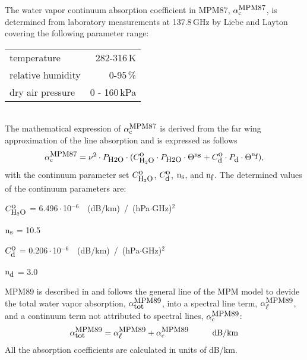 {
\label{levele:mpm87_h2ocont}
The water vapor continuum absorption coefficient in MPM87, $\alpha^{\mbox{\rm \small MPM87}}_{\rm c}$, 
is determined from laboratory measurements at 137.8\,GHz by Liebe 
and Layton covering the following parameter range:\\
\begin{tabular}{lr}
temperature          & 282-316\,K\\
relative humidity    & 0-95\,\%\\
dry air pressure     & 0 - 160\,kPa\\ 
\end{tabular}\\
The mathematical expression of $\alpha^{\mbox{\rm \small MPM87}}_{\rm c}$ is derived from the far wing 
approximation of the line absorption and is expressed as follows
\begin{equation} 
  \label{eq:mpm87:cont}
  \alpha^{\mbox{\rm \small MPM87}}_{\rm c} = \nu^2 \cdot P_{\mbox{\rm \small H2O}} \cdot 
                (C^{\mbox{\rm o}}_{\mbox{\rm \small H}_{2}\mbox{\rm \small O}} \cdot P_{\mbox{\rm \small H2O}} \cdot \Theta^{{\rm n}_{\mbox{\rm \small s}}} + 
                 C^{\mbox{\rm o}}_{\mbox{\rm \small d}} \cdot P_{\mbox{\rm \small d}}  \cdot \Theta^{{\rm n}_{\mbox{\rm \small f}}}),
\end{equation}
with the continuum parameter set $C^{\mbox{\rm o}}_{\mbox{\rm \small H}_{2}\mbox{\rm \small O}}$, $C^{\mbox{\rm o}}_{\mbox{\rm \small d}}$, ${\rm n}_{\mbox{\rm \small s}}$, and ${\rm n}_{\mbox{\rm \small f}}$. 
The determined values of the continuum parameters are:

\begin{description}
\item{$C^{\mbox{\rm o}}_{\mbox{\rm \small H}_{2}\mbox{\rm \small O}}$}   =  6.496\,$\cdot$\,10$^{-6}$~~(dB/km)~/~(hPa$\cdot$GHz)$^2$
\item{${\rm n}_{\mbox{\rm \small s}}$}    = 10.5
\item{$C^{\mbox{\rm o}}_{\mbox{\rm \small d}}$}   =  0.206\,$\cdot$\,10$^{-6}$~~(dB/km)~/~(hPa$\cdot$GHz)$^2$
\item{${\rm n}_{\mbox{\rm \small d}}$}    =  3.0
\end{description}




\label{leveld:mpm89}
%
MPM89 is described in \cite{liebe:89} and follows the general line 
of the MPM model to devide the total water vapor absorption, 
$\alpha^{\mbox{\rm \small MPM89}}_{\mbox{\small tot}}$, into a spectral line term, $\alpha^{\mbox{\rm \small MPM89}}_{\mbox{\small $\ell$}}$, and a continuum 
term not attributed to spectral lines, $\alpha^{\mbox{\rm \small MPM89}}_{\rm c}$:
\begin{equation}
  \label{eq:mpm89_abs}
  \alphampmmtot = \alphampmml + \alphampmmc\hspace*{10mm}\mbox{dB/km}
\end{equation}
All the absorption coefficients are calculated in units of \mbox{dB/km}.


}
